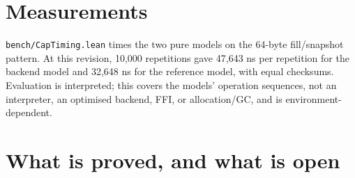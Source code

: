 \documentclass[10pt,a4paper]{article}
\begin{document}
\section{Measurements}

\texttt{bench/CapTiming.lean} times the two pure models on the 64-byte
fill/snapshot pattern. At this revision, 10,000 repetitions gave 47,643 ns per
repetition for the backend model and 32,648 ns for the reference model, with equal
checksums. Evaluation is interpreted; this covers the models' operation sequences,
not an interpreter, an optimised backend, FFI, or allocation/GC, and is
environment-dependent.

\section{What is proved, and what is open}\label{sec:open}
\end{document}
